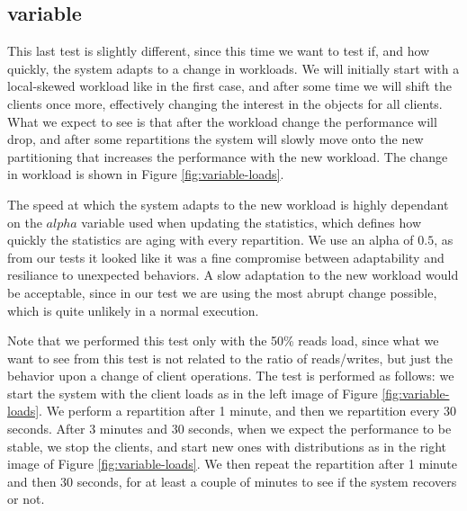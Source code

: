 \subsection{variable}\label{sec:variable}
This last test is slightly different, since this time we want to test if, and how quickly, the system adapts to a change in workloads. We will initially start with a local-skewed workload like in the first case, and after some time we will shift the clients once more, effectively changing the interest in the objects for all clients. What we expect to see is that after the workload change the performance will drop, and after some repartitions the system will slowly move onto the new partitioning that increases the performance with the new workload. The change in workload is shown in Figure \ref{fig:variable-loads}.

The speed at which the system adapts to the new workload is highly dependant on the $alpha$ variable used when updating the statistics, which defines how quickly the statistics are aging with every repartition. We use an alpha of $0.5$, as from our tests it looked like it was a fine compromise between adaptability and resiliance to unexpected behaviors. A slow adaptation to the new workload would be acceptable, since in our test we are using the most abrupt change possible, which is quite unlikely in a normal execution.

Note that we performed this test only with the 50\% reads load, since what we want to see from this test is not related to the ratio of reads/writes, but just the behavior upon a change of client operations. The test is performed as follows: we start the system with the client loads as in the left image of Figure \ref{fig:variable-loads}. We perform a repartition after 1 minute, and then we repartition every 30 seconds. After 3 minutes and 30 seconds, when we expect the performance to be stable, we stop the clients, and start new ones with distributions as in the right image of Figure \ref{fig:variable-loads}. We then repeat the repartition after 1 minute and then 30 seconds, for at least a couple of minutes to see if the system recovers or not.

